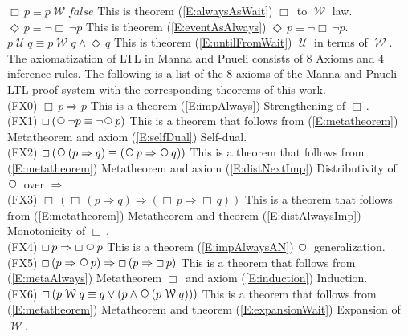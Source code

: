\documentclass[12pt, fleqn, leqno]{article}
\newcommand{\impl}{\ensuremath{\Rightarrow}}        %
\newcommand{\Until}{\;\mathcal{U}\;}
\newcommand{\Wait}{\;\mathcal{W}\;}
\newcommand{\Next}{\;\,\text{\raisebox{3.5pt}{\circle{6}}}}
\newcommand{\Event}{\Diamond\,}
\newcommand{\Always}{\Box\,}
\begin{document}
$\Always p \equiv p \Wait false$   This is theorem (\ref{E:alwaysAsWait}) $\Always$ to $\Wait$ law.\\

$\Event p \equiv \neg \Always \neg p$   This is theorem (\ref{E:eventAsAlways}) $\Event p \equiv \neg \Always \neg p$. \\

$p \Until q \equiv p \Wait q \land \Event q$   This is theorem (\ref{E:untilFromWait}) $\Until$ in terms of $\Wait$.\\

The axiomatization of LTL in Manna and Pnueli consists of 8 Axioms and 4 inference rules. The following is
a list of the 8 axioms of the Manna and Pnueli LTL proof system with the corresponding theorems of this work.\\

(FX0) $\Always p \impl p$ This is a theorem (\ref{E:impAlways}) Strengthening of $\Always$.\\

(FX1) $\Always (\Next \neg p \equiv \neg \Next p)$ This is a theorem that follows from (\ref{E:metatheorem}) Metatheorem
and axiom (\ref{E:selfDual}) Self-dual.\\

(FX2) $\Always (\Next (p \impl q)  \equiv ( \Next p \impl \Next q))$ This is a theorem that follows
from (\ref{E:metatheorem}) Metatheorem and axiom (\ref{E:distNextImp}) Distributivity of $\Next$ over $\impl$.\\

(FX3) $\Always (\Always (p \impl q)  \impl ( \Always p \impl \Always q))$ This is a theorem that follows
from (\ref{E:metatheorem}) Metatheorem and theorem (\ref{E:distAlwaysImp}) Monotonicity of $\Always$.\\

(FX4) $\Always p \impl \Always \Next p$ This is a theorem (\ref{E:impAlwaysAN}) $\Next$ generalization.\\

(FX5) $\Always  (p \impl \Next p)  \impl  \Always (p \impl \Always p)$ This is a theorem that follows
from (\ref{E:metaAlways}) Metatheorem $\Always$ and axiom (\ref{E:induction}) Induction.\\

(FX6) $\Always (p \Wait q \equiv q \lor (p \land \Next (p \Wait q)))$ This is a theorem that follows
from (\ref{E:metatheorem}) Metatheorem and theorem (\ref{E:expansionWait}) Expansion of $\Wait$.\\
\end{document}
